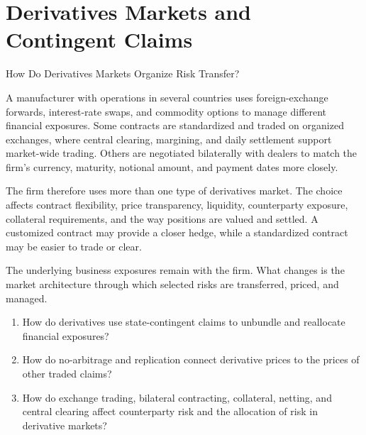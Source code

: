 \chapter{Derivatives Markets and Contingent Claims}
\label{chap:Derivatives_Markets_and_Contingent_Claims}

\begin{openingcase}{How Do Derivatives Markets Organize Risk Transfer?}

A manufacturer with operations in several countries uses foreign-exchange forwards, interest-rate swaps, and commodity options to manage different financial exposures. Some contracts are standardized and traded on organized exchanges, where central clearing, margining, and daily settlement support market-wide trading. Others are negotiated bilaterally with dealers to match the firm's currency, maturity, notional amount, and payment dates more closely.

The firm therefore uses more than one type of derivatives market. The choice affects contract flexibility, price transparency, liquidity, counterparty exposure, collateral requirements, and the way positions are valued and settled. A customized contract may provide a closer hedge, while a standardized contract may be easier to trade or clear.

The underlying business exposures remain with the firm. What changes is the market architecture through which selected risks are transferred, priced, and managed.

\end{openingcase}



\begin{tcolorbox}[
  enhanced,
  colback=FinanceBlue!6,
  colframe=FinanceBlue,
  boxrule=0.6pt,
  sharp corners,
  left=8pt,
  right=8pt,
  top=7pt,
  bottom=7pt,
  before skip=1em,
  after skip=1.6em,
  title=\textbf{Core Questions},
  coltitle=white,
  colbacktitle=FinanceBlue,
  fonttitle=\bfseries,
  attach boxed title to top left={xshift=6pt,yshift=-2mm},
  boxed title style={
    boxrule=0pt,
    sharp corners,
    left=5pt,
    right=5pt,
    top=2pt,
    bottom=2pt
  }
]
\begin{enumerate}[
  leftmargin=*,
  label=\textcolor{FinanceBlue}{\textbf{\arabic*.}},
  itemsep=0.55em,
  topsep=0.2em
]


\item How do derivatives use state-contingent claims to unbundle and reallocate financial exposures?

\item How do no-arbitrage and replication connect derivative prices to the prices of other traded claims?

\item How do exchange trading, bilateral contracting, collateral, netting, and central clearing affect counterparty risk and the allocation of risk in derivative markets?


\end{enumerate}
\end{tcolorbox}


